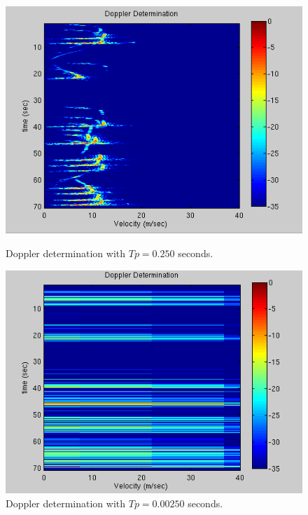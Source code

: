 \documentclass{article}
\begin{document}
\begin{figure}[ht]
\begin{minipage}[b]{0.33\linewidth}
\centering
\includegraphics[width=\textwidth]{Figures/Tp_normal.png}
\caption{Doppler determination with $Tp = 0.250 $ seconds.}
\label{fig:Tp_normal}
\end{minipage}
\begin{minipage}[b]{0.33\linewidth}
\centering
\includegraphics[width=\textwidth]{Figures/Tp_reduced.png}
\caption{Doppler determination with $Tp = 0.00250 $ seconds.}
\label{fig:Tp_reduced}
\end{minipage}
\begin{minipage}[b]{0.33\linewidth}
\centering

\end{minipage}
\end{figure}
\end{document}
